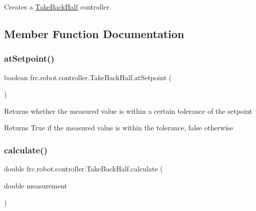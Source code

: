 Creates a \mbox{\hyperlink{classfrc_1_1robot_1_1controller_1_1_take_back_half}{Take\+Back\+Half}} controller. 

\subsection{Member Function Documentation}
\mbox{\label{classfrc_1_1robot_1_1controller_1_1_take_back_half_a5ba31d17fb06ddf4d84654fba7cb71b8}} 
\subsubsection{\texorpdfstring{atSetpoint()}{atSetpoint()}}
{\footnotesize\ttfamily boolean frc.\+robot.\+controller.\+Take\+Back\+Half.\+at\+Setpoint (\begin{DoxyParamCaption}{ }\end{DoxyParamCaption})\hspace{0.3cm}{\ttfamily [inline]}}

Returns whether the measured value is within a certain tolerance of the setpoint

\begin{DoxyReturn}{Returns}
True if the measured value is within the tolerance, false otherwise 
\end{DoxyReturn}
\mbox{\label{classfrc_1_1robot_1_1controller_1_1_take_back_half_a9efd4ffb736db38bb125fc80a5a72740}} 
\subsubsection{\texorpdfstring{calculate()}{calculate()}}
{\footnotesize\ttfamily double frc.\+robot.\+controller.\+Take\+Back\+Half.\+calculate (\begin{DoxyParamCaption}\item[{double}]{measurement }\end{DoxyParamCaption})\hspace{0.3cm}{\ttfamily [inline]}}

